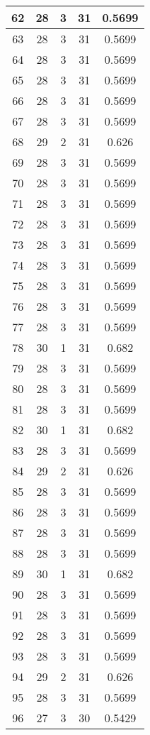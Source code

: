 \documentclass[letterpaper, 12pt]{article}
\begin{document}
\begin{longtable}{|c|c|c|c|c|}
\hline
62 & 28 & 3 & 31 & 0.5699 \\
\hline
63 & 28 & 3 & 31 & 0.5699 \\
\hline
64 & 28 & 3 & 31 & 0.5699 \\
\hline
65 & 28 & 3 & 31 & 0.5699 \\
\hline
66 & 28 & 3 & 31 & 0.5699 \\
\hline
67 & 28 & 3 & 31 & 0.5699 \\
\hline
68 & 29 & 2 & 31 & 0.626 \\
\hline
69 & 28 & 3 & 31 & 0.5699 \\
\hline
70 & 28 & 3 & 31 & 0.5699 \\
\hline
71 & 28 & 3 & 31 & 0.5699 \\
\hline
72 & 28 & 3 & 31 & 0.5699 \\
\hline
73 & 28 & 3 & 31 & 0.5699 \\
\hline
74 & 28 & 3 & 31 & 0.5699 \\
\hline
75 & 28 & 3 & 31 & 0.5699 \\
\hline
76 & 28 & 3 & 31 & 0.5699 \\
\hline
77 & 28 & 3 & 31 & 0.5699 \\
\hline
78 & 30 & 1 & 31 & 0.682 \\
\hline
79 & 28 & 3 & 31 & 0.5699 \\
\hline
80 & 28 & 3 & 31 & 0.5699 \\
\hline
81 & 28 & 3 & 31 & 0.5699 \\
\hline
82 & 30 & 1 & 31 & 0.682 \\
\hline
83 & 28 & 3 & 31 & 0.5699 \\
\hline
84 & 29 & 2 & 31 & 0.626 \\
\hline
85 & 28 & 3 & 31 & 0.5699 \\
\hline
86 & 28 & 3 & 31 & 0.5699 \\
\hline
87 & 28 & 3 & 31 & 0.5699 \\
\hline
88 & 28 & 3 & 31 & 0.5699 \\
\hline
89 & 30 & 1 & 31 & 0.682 \\
\hline
90 & 28 & 3 & 31 & 0.5699 \\
\hline
91 & 28 & 3 & 31 & 0.5699 \\
\hline
92 & 28 & 3 & 31 & 0.5699 \\
\hline
93 & 28 & 3 & 31 & 0.5699 \\
\hline
94 & 29 & 2 & 31 & 0.626 \\
\hline
95 & 28 & 3 & 31 & 0.5699 \\
\hline
96 & 27 & 3 & 30 & 0.5429 \\

\end{longtable}
\end{document}
